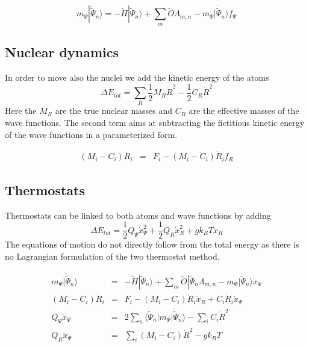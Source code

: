 \documentclass[final,12pt]{article}
\begin{document}
{{{{{{\begin{equation}
m_\Psi|\ddot{\tilde\Psi}_n\rangle=-\tilde{H}|\tilde\Psi_n\rangle
+\sum_m\tilde{O}\Lambda_{m,n}
-m_\Psi|\dot{\tilde\Psi}_n\rangle f_\Psi
\end{equation}

\subsection{Nuclear dynamics}
In order to move also the nuclei we add the kinetic energy of the
atoms
\begin{equation}
\Delta E_{tot}=\sum_R \frac{1}{2}M_R\dot{R}^2-\frac{1}{2}C_R\dot{R}^2
\end{equation}
Here the $M_R$ are the true nuclear masses and $C_R$ are the effective
masses of the wave functions. The second term aims at subtracting the
fictitious kinetic energy of the wave functions in a parameterized form.

\begin{eqnarray*}
(M_i-C_i)\ddot{R}_i&=&F_i-(M_i-C_i)\dot{R}_i f_R
\end{eqnarray*}

\subsection{Thermostats}
Thermostats can be linked to both atoms and wave functions by adding
\begin{equation}
\Delta E_{tot}=\frac{1}{2}Q_\Psi\dot{x}_\Psi^2+\frac{1}{2}Q_R\dot{x}_R^2+gk_BT x_R
\end{equation}
The equations of motion do not directly follow from the total energy
as there is no Lagrangian formulation of the two thermostat method.

\begin{eqnarray*}
m_\Psi|\ddot{\tilde\Psi}_n\rangle&=&-\tilde{H}|\tilde\Psi_n\rangle+
\sum_m\tilde{O}|\tilde\Psi_n\Lambda_{m,n}
-m_\Psi|\dot{\tilde\Psi}_n\rangle \dot{x}_\Psi
\\
(M_i-C_i)\ddot{R}_i&=&F_i-(M_i-C_i)\dot{R}_i\dot{x}_R
+C_i\dot{R}_i\dot{x}_\Psi 
\\
Q_\Psi\ddot{x}_\Psi&=&2\sum_n
\langle\dot{\tilde\Psi}_n|m_\Psi|\dot{\tilde\Psi}_n\rangle 
-\sum_i C_i\dot{R}^2
\\
Q_R\ddot{x}_\Psi&=& \sum_i (M_i-C_i)\dot{R}^2-gk_BT
\end{eqnarray*}

}}}}}}
\end{document}

